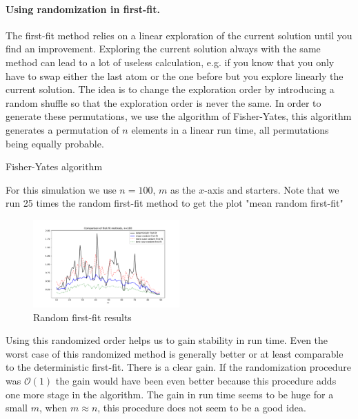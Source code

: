 \documentclass{amsart}
\begin{document}
\clearpage
\paragraph{\textbf{Using randomization in first-fit.}}
The first-fit method relies on a linear exploration of the current solution until you find an improvement. Exploring the current solution always with the same method can lead to a lot of useless calculation, e.g. if you know that you only have to swap either the last atom or the one before but you explore linearly the current solution. The idea is to change the exploration order by introducing a random shuffle so that the exploration order is never the same. In order to generate these permutations, we use the algorithm of Fisher-Yates, this algorithm generates a permutation of $n$ elements in a linear run time, all permutations being equally probable.
\begin{algorithm}\caption{Fisher-Yates algorithm}\label{fisher yat}
\end{algorithm}
For this simulation we use $n=100$, $m$ as the $x$-axis and  starters. Note that we run 25 times the random first-fit method to get the plot "mean random first-fit"
\begin{figure}[ht]
    \centering
    \includegraphics[width=0.5\textwidth]{plots/random first fit.pdf}
    \caption{Random first-fit results}
    \label{random ff}
\end{figure}
Using this randomized order helps us to gain stability in run time. Even the worst case of this randomized method is generally better or at least comparable to the deterministic first-fit. There is a clear gain. If the randomization procedure was $\mathcal{O}\left(1\right)$ the gain would have been even better because this procedure adds one more stage in the algorithm. The gain in run time seems to be huge for a small $m$, when $m\approx n$, this procedure does not seem to be a good idea.
\end{document}
